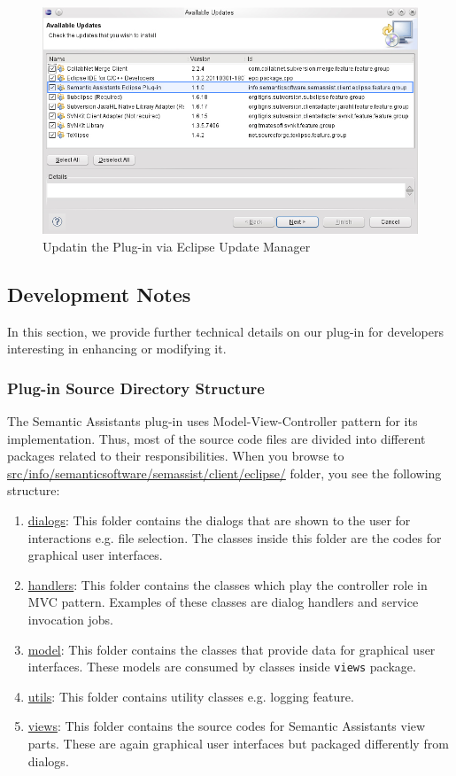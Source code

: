 \begin{figure}[htb]
\begin{center}
  \includegraphics[width=1.0\textwidth]{pictures/eclipse_update.jpg}
  \caption{Updatin the Plug-in via Eclipse Update Manager}
  \label{fig:eclipse_update}
\end{center}
\end{figure}

\subsection{Development Notes}
\label{subsec:eclipse.development}
In this section, we provide further technical details on our plug-in for
developers interesting in enhancing or modifying it.

\subsubsection{Plug-in Source Directory Structure}
The Semantic Assistants plug-in uses Model-View-Controller pattern for its
implementation. Thus, most of the source code files are divided into different
packages related to their responsibilities. When you browse to
\url{src/info/semanticsoftware/semassist/client/eclipse/} folder, you see the
following structure:
\begin{enumerate}
\item\url{dialogs}: This folder contains the dialogs that are shown to the user
for interactions e.g. file selection. The classes inside this folder are the
codes for graphical user interfaces.
\item\url{handlers}: This folder contains the classes which play the controller
role in MVC pattern. Examples of these classes are dialog handlers and service
invocation jobs.
\item\url{model}: This folder contains the classes that provide data for
graphical user interfaces. These models are consumed by classes inside
\texttt{views} package.
\item\url{utils}: This folder contains utility classes e.g. logging feature.
\item\url{views}: This folder contains the source codes for Semantic Assistants
view parts. These are again graphical user interfaces but packaged differently
from dialogs.
\end{enumerate}

